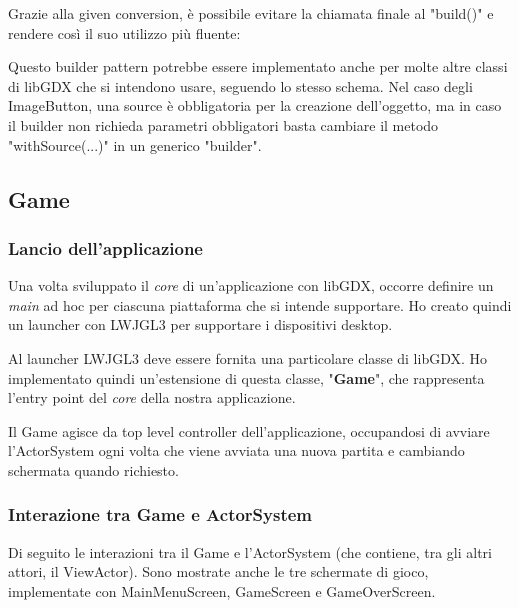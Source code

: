 

Grazie alla given conversion, è possibile evitare la chiamata finale al "build()" e rendere così il suo utilizzo più fluente:



Questo builder pattern potrebbe essere implementato anche per molte altre classi di libGDX che si intendono usare, seguendo lo stesso schema.
Nel caso degli ImageButton, una source è obbligatoria per la creazione dell'oggetto, ma in caso il builder non richieda parametri obbligatori basta cambiare il metodo "withSource(...)" in un generico "builder".


\subsection{Game}

\subsubsection{Lancio dell'applicazione}
Una volta sviluppato il \textit{core} di un'applicazione con libGDX, occorre definire un \textit{main} ad hoc per ciascuna piattaforma che si intende supportare. Ho creato quindi un launcher con LWJGL3 per supportare i dispositivi desktop.

Al launcher LWJGL3 deve essere fornita una particolare classe di libGDX. Ho implementato quindi un'estensione di questa classe, "\textbf{Game}", che rappresenta l'entry point del \textit{core} della nostra applicazione.

Il Game agisce da top level controller dell'applicazione, occupandosi di avviare l'ActorSystem ogni volta che viene avviata una nuova partita e cambiando schermata quando richiesto.

\subsubsection{Interazione tra Game e ActorSystem}
Di seguito le interazioni tra il Game e l'ActorSystem (che contiene, tra gli altri attori, il ViewActor).
Sono mostrate anche le tre schermate di gioco, implementate con MainMenuScreen, GameScreen e GameOverScreen.


